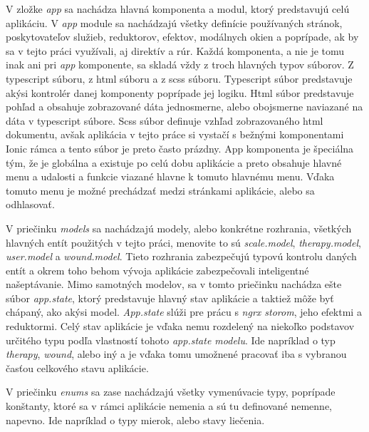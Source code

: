 V zložke \textit{app} sa nachádza hlavná komponenta a modul, ktorý predstavujú celú aplikáciu. V \textit{app} module sa nachádzajú všetky definície používaných stránok, poskytovateľov služieb, reduktorov, efektov, modálnych okien a poprípade, ak by sa v tejto práci využívali, aj direktív a rúr. Každá komponenta, a nie je tomu inak ani pri \textit{app} komponente, sa skladá vždy z troch hlavných typov súborov. Z typescript súboru, z html súboru a z scss súboru. Typescript súbor predstavuje akýsi kontrolér danej komponenty poprípade jej logiku. Html súbor predstavuje pohľad a obsahuje zobrazované dáta jednosmerne, alebo obojsmerne naviazané na dáta v typescript súbore. Scss súbor definuje vzhľad zobrazovaného html dokumentu, avšak aplikácia v tejto práce si vystačí s bežnými komponentami Ionic rámca a tento súbor je preto často prázdny. App komponenta je špeciálna tým, že je globálna a existuje po celú dobu aplikácie a preto obsahuje hlavné menu a udalosti a funkcie viazané hlavne k tomuto hlavnému menu. Vďaka tomuto menu je možné prechádzať medzi stránkami aplikácie, alebo sa odhlasovať.

V priečinku \textit{models} sa nachádzajú modely, alebo konkrétne rozhrania, všetkých hlavných entít použitých v tejto práci, menovite to sú \textit{scale.model}, \textit{therapy.model}, \textit{user.model} a \textit{wound.model}. Tieto rozhrania zabezpečujú typovú kontrolu daných entít a okrem toho behom vývoja aplikácie zabezpečovali inteligentné našeptávanie. Mimo samotných modelov, sa v tomto priečinku nachádza ešte súbor \textit{app.state}, ktorý predstavuje hlavný stav aplikácie a taktiež môže byť chápaný, ako akýsi model. \textit{App.state} slúži pre prácu s \textit{ngrx storom}, jeho efektmi a reduktormi. Celý stav aplikácie je vďaka nemu rozdelený na niekoľko podstavov určitého typu podľa vlastností tohoto \textit{app.state modelu}. Ide napríklad o typ \textit{therapy}, \textit{wound}, alebo iný a je vďaka tomu umožnené pracovať iba s vybranou časťou celkového stavu aplikácie.

V priečinku \textit{enums} sa zase nachádzajú všetky vymenúvacie typy, poprípade konštanty, ktoré sa v rámci aplikácie nemenia a sú tu definované nemenne, napevno. Ide napríklad o typy mierok, alebo stavy liečenia.

